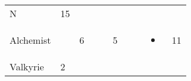 \documentclass[12pt]{article}
\begin{document}
\begin{longtable}[]{@{}llllllllll@{}}
\begin{minipage}[t]{0.07\columnwidth}\raggedright\strut
N
\strut\end{minipage} &
\begin{minipage}[t]{0.08\columnwidth}\raggedright\strut
15
\strut\end{minipage}\tabularnewline
\begin{minipage}[t]{0.13\columnwidth}\raggedright\strut
Alchemist
\strut\end{minipage} &
\begin{minipage}[t]{0.06\columnwidth}\raggedright\strut
\strut\end{minipage} &
\begin{minipage}[t]{0.06\columnwidth}\raggedright\strut
6
\strut\end{minipage} &
\begin{minipage}[t]{0.06\columnwidth}\raggedright\strut
\strut\end{minipage} &
\begin{minipage}[t]{0.06\columnwidth}\raggedright\strut
\strut\end{minipage} &
\begin{minipage}[t]{0.06\columnwidth}\raggedright\strut
5
\strut\end{minipage} &
\begin{minipage}[t]{0.06\columnwidth}\raggedright\strut
\strut\end{minipage} &
\begin{minipage}[t]{0.06\columnwidth}\raggedright\strut
\strut\end{minipage} &
\begin{minipage}[t]{0.07\columnwidth}\raggedright\strut
\begin{itemize}
\item
\end{itemize}
\strut\end{minipage} &
\begin{minipage}[t]{0.08\columnwidth}\raggedright\strut
11
\strut\end{minipage}\tabularnewline
\begin{minipage}[t]{0.13\columnwidth}\raggedright\strut
Valkyrie
\strut\end{minipage} &
\begin{minipage}[t]{0.06\columnwidth}\raggedright\strut
2
\strut\end{minipage} &
\begin{minipage}[t]{0.06\columnwidth}\raggedright\strut
\strut\end{minipage} &

\end{longtable}
\end{document}

